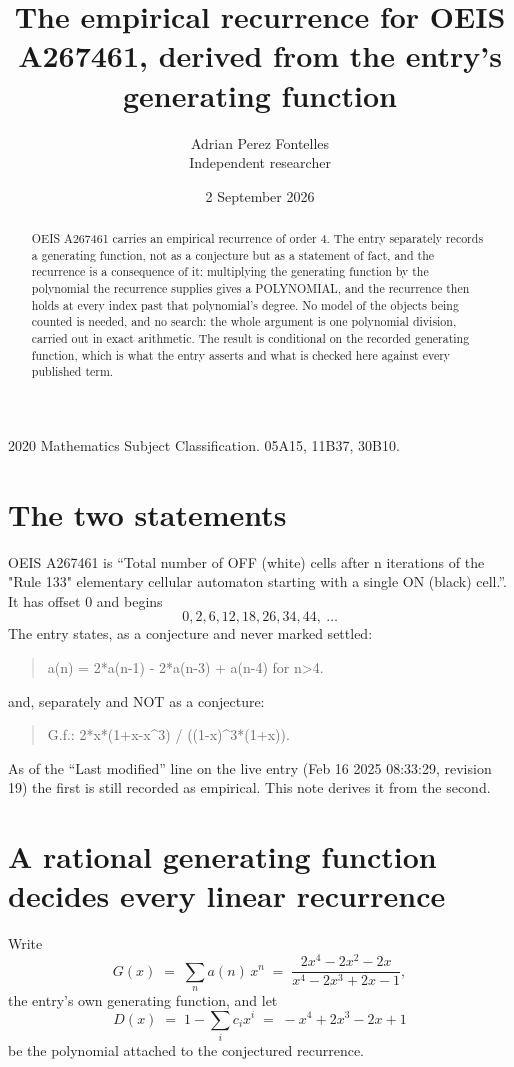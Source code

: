\documentclass[11pt,a4paper]{article}
\title{The empirical recurrence for OEIS A267461, derived from the entry's generating function}
\author{Adrian Perez Fontelles\\ \small Independent researcher}
\date{2 September 2026}
\theoremstyle{plain}
\theoremstyle{definition}
\begin{document}
\maketitle

\begin{abstract}
OEIS A267461 carries an empirical recurrence of order $4$. The entry separately records a
generating function, not as a conjecture but as a statement of fact, and the recurrence is a
consequence of it: multiplying the generating function by the polynomial the recurrence
supplies gives a POLYNOMIAL, and the recurrence then holds at every index past that
polynomial's degree. No model of the objects being counted is needed, and no search: the
whole argument is one polynomial division, carried out in exact arithmetic. The result is
conditional on the recorded generating function, which is what the entry asserts and what is
checked here against every published term.
\end{abstract}

\noindent\small 2020 Mathematics Subject Classification. 05A15, 11B37, 30B10.\normalsize

\section{The two statements}

OEIS A267461 is ``Total number of OFF (white) cells after n iterations of the "Rule 133" elementary cellular automaton starting with a single ON (black) cell.''. It has offset $0$ and begins
\[
0, 2, 6, 12, 18, 26, 34, 44,\ \dots
\]
The entry states, as a conjecture and never marked settled:
\begin{quote}
a(n) = 2*a(n-1) - 2*a(n-3) + a(n-4) for n>4.
\end{quote}
and, separately and NOT as a conjecture:
\begin{quote}
G.f.: 2*x*(1+x-x\^{}3) / ((1-x)\^{}3*(1+x)).
\end{quote}
As of the ``Last modified'' line on the live entry (Feb 16 2025 08:33:29, revision 19) the first is still
recorded as empirical. This note derives it from the second.

\section{A rational generating function decides every linear recurrence}

Write
\[
G(x)\;=\;\sum_{n}a(n)\,x^{n}\;=\;\frac{2 x^{4} - 2 x^{2} - 2 x}{x^{4} - 2 x^{3} + 2 x - 1},
\]
the entry's own generating function, and let
\[
D(x)\;=\;1-\sum_i c_i x^{i}\;=\;- x^{4} + 2 x^{3} - 2 x + 1
\]
be the polynomial attached to the conjectured recurrence.
\end{document}
